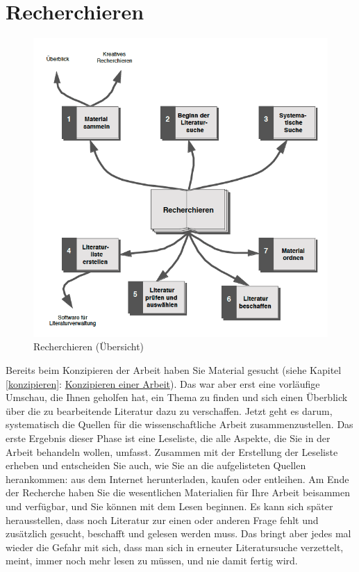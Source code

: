 \documentclass[]{book}
\theoremstyle{definition}
\theoremstyle{definition}
\theoremstyle{definition}
\theoremstyle{remark}
\begin{document}
\hypertarget{recherchieren}{\chapter{Recherchieren}\label{recherchieren}}

\begin{figure}

{\centering \includegraphics{images/recherchieren-min} 

}

\caption{Recherchieren (Übersicht)}\label{fig:unnamed-chunk-3}
\end{figure}

Bereits beim Konzipieren der Arbeit haben Sie Material gesucht (siehe
Kapitel \ref{konzipieren}: \protect\hyperlink{konzipieren}{Konzipieren
einer Arbeit}). Das war aber erst eine vorläufige Umschau, die Ihnen
geholfen hat, ein Thema zu finden und sich einen Überblick über die zu
bearbeitende Literatur dazu zu verschaffen. Jetzt geht es darum,
systematisch die Quellen für die wissenschaftliche Arbeit
zusammenzustellen. Das erste Ergebnis dieser Phase ist eine Leseliste,
die alle Aspekte, die Sie in der Arbeit behandeln wollen, umfasst.
Zusammen mit der Erstellung der Leseliste erheben und entscheiden Sie
auch, wie Sie an die aufgelisteten Quellen herankommen: aus dem Internet
herunterladen, kaufen oder entleihen. Am Ende der Recherche haben Sie
die wesentlichen Materialien für Ihre Arbeit beisammen und verfügbar,
und Sie können mit dem Lesen beginnen. Es kann sich später
herausstellen, dass noch Literatur zur einen oder anderen Frage fehlt
und zusätzlich gesucht, beschafft und gelesen werden muss. Das bringt
aber jedes mal wieder die Gefahr mit sich, dass man sich in erneuter
Literatursuche verzettelt, meint, immer noch mehr lesen zu müssen, und
nie damit fertig wird.
\end{document}
